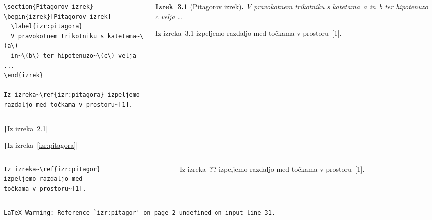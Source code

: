 \documentclass[aspectratio=169]{beamer}
\newcommand{\razdelek}[2]{\par\smallskip{\large\bfseries #1\quad #2}\par\smallskip}
\newcommand{\izrekams}[2]{\textbf{Izrek~#1} (#2)\textbf{.}}
\begin{document}
\begin{frame}[fragile]{}
  \begin{columns}[T]
    \begin{column}{0.55\textwidth}
      \begin{verbatim}
\section{Pitagorov izrek}
\begin{izrek}[Pitagorov izrek]
  \label{izr:pitagora}
  V pravokotnem trikotniku s katetama~\(a\)
  in~\(b\) ter hipotenuzo~\(c\) velja ...
\end{izrek}

Iz izreka~\ref{izr:pitagora} izpeljemo
razdaljo med točkama v prostoru~[1].
      \end{verbatim}
    \end{column}
    \begin{column}{0.4\textwidth}
      \footnotesize
      \razdelek{3}{Pitagorov izrek}
      \izrekams{3.1}{Pitagorov izrek}
      \emph{V pravokotnem trikotniku s katetama~\(a\) in~\(b\) ter hipotenuzo~\(c\) velja \dots}

      Iz izreka~3.1 izpeljemo razdaljo med točkama v prostoru~[1].
    \end{column}
  \end{columns}
  \bigskip
\end{frame}

\begin{frame}[fragile]
  \begin{center}
    \Large
    \texttt|Iz izreka~2.1|
    \bigskip

    \texttt|Iz izreka~\ref{izr:pitagora}|
  \end{center}
  \bigskip
\end{frame}

\begin{frame}[fragile]{}
  \begin{columns}[T]
    \begin{column}{0.55\textwidth}
      \begin{verbatim}
Iz izreka~\ref{izr:pitagor}
izpeljemo razdaljo med
točkama v prostoru~[1].
      \end{verbatim}
    \end{column}
    \begin{column}{0.4\textwidth}
      Iz izreka~\textbf{??} izpeljemo razdaljo med točkama v prostoru~[1].
    \end{column}
  \end{columns}
  \bigskip
  \begin{verbatim}
LaTeX Warning: Reference `izr:pitagor' on page 2 undefined on input line 31.
  \end{verbatim}
\end{frame}
\end{document}

